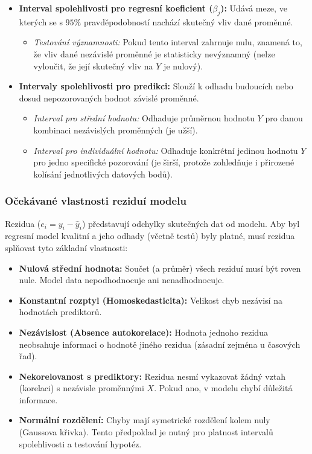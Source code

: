 \begin{itemize}
    \item \textbf{Interval spolehlivosti pro regresní koeficient ($\beta_j$):} Udává meze, ve kterých se s $95\%$ pravděpodobností nachází skutečný vliv dané proměnné.
    \begin{itemize}
        \item \textit{Testování významnosti:} Pokud tento interval zahrnuje nulu, znamená to, že vliv dané nezávislé proměnné je statisticky nevýznamný (nelze vyloučit, že její skutečný vliv na $Y$ je nulový).
    \end{itemize}
    \item \textbf{Intervaly spolehlivosti pro predikci:} Slouží k odhadu budoucích nebo dosud nepozorovaných hodnot závislé proměnné.
    \begin{itemize}
        \item \textit{Interval pro střední hodnotu:} Odhaduje průměrnou hodnotu $Y$ pro danou kombinaci nezávislých proměnných (je užší).
        \item \textit{Interval pro individuální hodnotu:} Odhaduje konkrétní jedinou hodnotu $Y$ pro jedno specifické pozorování (je širší, protože zohledňuje i přirozené kolísání jednotlivých datových bodů).
    \end{itemize}
\end{itemize}

\subsubsection*{Očekávané vlastnosti reziduí modelu}
Rezidua ($e_i = y_i - \hat{y}_i$) představují odchylky skutečných dat od modelu. Aby byl regresní model kvalitní a jeho odhady (včetně testů) byly platné, musí rezidua splňovat tyto základní vlastnosti:

\begin{itemize}
    \item \textbf{Nulová střední hodnota:} Součet (a průměr) všech reziduí musí být roven nule. Model data nepodhodnocuje ani nenadhodnocuje.
    \item \textbf{Konstantní rozptyl (Homoskedasticita):} Velikost chyb nezávisí na hodnotách prediktorů.
    \item \textbf{Nezávislost (Absence autokorelace):} Hodnota jednoho rezidua neobsahuje informaci o hodnotě jiného rezidua (zásadní zejména u časových řad).
    \item \textbf{Nekorelovanost s prediktory:} Rezidua nesmí vykazovat žádný vztah (korelaci) s nezávisle proměnnými $X$. Pokud ano, v modelu chybí důležitá informace.
    \item \textbf{Normální rozdělení:} Chyby mají symetrické rozdělení kolem nuly (Gaussova křivka). Tento předpoklad je nutný pro platnost intervalů spolehlivosti a testování hypotéz.
\end{itemize}

